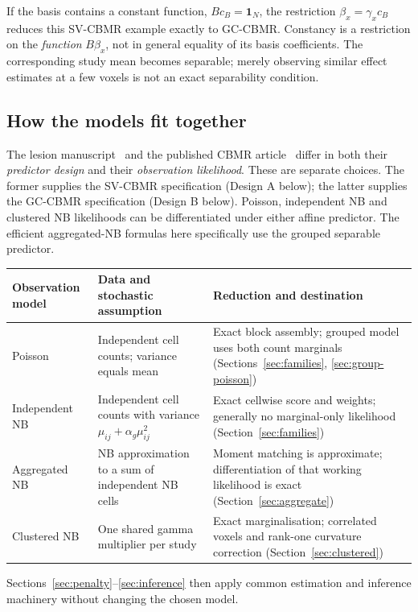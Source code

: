 \documentclass[11pt,a4paper]{article}
\numberwithin{equation}{section}
\begin{document}
If the basis contains a constant function, $Bc_B=\mathbf1_N$, the
restriction $\beta_x=\gamma_x c_B$ reduces this SV-CBMR example exactly
to GC-CBMR. Constancy is a restriction on the \emph{function}
$B\beta_x$, not in general equality of its basis coefficients. The
corresponding study mean becomes separable; merely observing similar
effect estimates at a few voxels is not an exact separability condition.

\subsection{How the models fit together}
The lesion manuscript~\cite{lesion} and the published CBMR
article~\cite{published} differ in both their \emph{predictor design} and
their \emph{observation likelihood}. These are separate choices.
The former supplies the SV-CBMR specification (Design A below);
the latter supplies the GC-CBMR specification (Design B below).
Poisson, independent NB and clustered NB
likelihoods can be differentiated under either affine predictor.
The efficient aggregated-NB formulas here specifically use the grouped
separable predictor.

\begin{center}\small
\begin{tabularx}{\textwidth}{lTT}
\toprule
Observation model & Data and stochastic assumption & Reduction and destination\\
\midrule
Poisson & Independent cell counts; variance equals mean &
Exact block assembly; grouped model uses both count marginals
(Sections~\ref{sec:families}, \ref{sec:group-poisson})\\
Independent NB & Independent cell counts with variance
$\mu_{ij}+\alpha_g\mu_{ij}^2$ &
Exact cellwise score and weights; generally no marginal-only likelihood
(Section~\ref{sec:families})\\
Aggregated NB & NB approximation to a sum of independent NB cells &
Moment matching is approximate; differentiation of that working likelihood
is exact (Section~\ref{sec:aggregate})\\
Clustered NB & One shared gamma multiplier per study &
Exact marginalisation; correlated voxels and rank-one curvature correction
(Section~\ref{sec:clustered})\\
\bottomrule
\end{tabularx}
\end{center}
Sections~\ref{sec:penalty}--\ref{sec:inference} then apply common estimation
and inference machinery without changing the chosen model.
\end{document}
